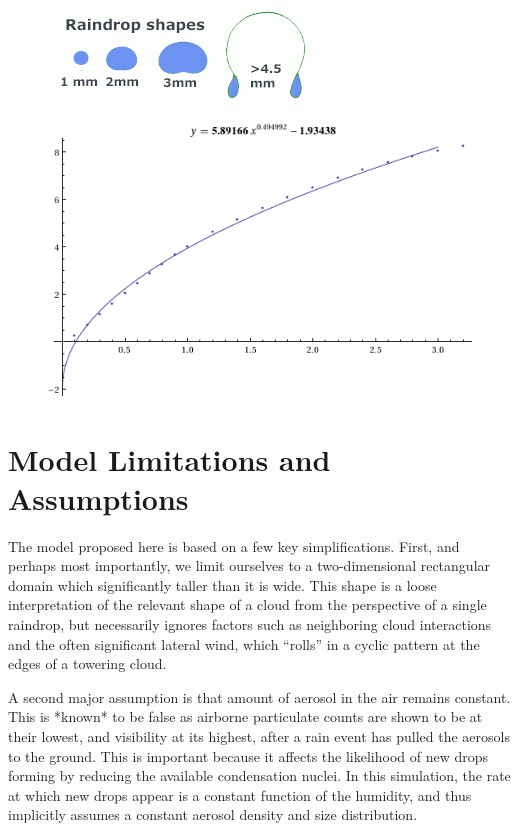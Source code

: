 \documentclass[twocolumn,a4paper,10pt]{article}
\begin{document}
\begin{figure}[h]
    \centering
    \includegraphics[width=0.75\linewidth]{raindrop_shapes}
    \caption{}
    \label{fig:raindrop}
\end{figure}
\begin{figure}[t]
    \centering
    \includegraphics[width=0.75\linewidth]{terminal_velocity}
    \caption{}
    \label{fig:velocity}
\end{figure}


\section{Model Limitations and Assumptions}

The model proposed here is based on a few key simplifications. First, and
perhaps most importantly, we limit ourselves to a two-dimensional rectangular
domain which significantly taller than it is wide. This shape is a loose
interpretation of the relevant shape of a cloud from the perspective of a single
raindrop, but necessarily ignores factors such as neighboring cloud
interactions and the often significant lateral wind, which ``rolls'' in a cyclic
pattern at the edges of a towering cloud.

A second major assumption is that amount of aerosol in the air remains constant.
This is *known* to be false as airborne particulate counts are shown to be at
their lowest, and visibility at its highest, after a rain event has pulled the
aerosols to the ground. This is important because it affects the likelihood of
new drops forming by reducing the available condensation nuclei. In this
simulation, the rate at which new drops appear is a constant function of the
humidity, and thus implicitly assumes a constant aerosol density and size
distribution.
\end{document}

